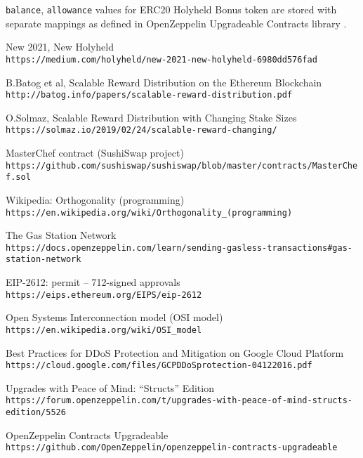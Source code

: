 \documentclass[12pt]{article}
\begin{document}
\texttt{balance}, \texttt{allowance} values for ERC20 Holyheld Bonus token are stored with separate mappings as defined in OpenZeppelin Upgradeable Contracts library \cite{openzeppelin_upgradeable}.





\begin{thebibliography}{3}

New 2021, New Holyheld
\\\texttt{https://medium.com/holyheld/new-2021-new-holyheld-6980dd576fad}

B.Batog et al, Scalable Reward Distribution on the Ethereum Blockchain
\\\texttt{http://batog.info/papers/scalable-reward-distribution.pdf}

O.Solmaz, Scalable Reward Distribution with Changing Stake Sizes
\\\texttt{https://solmaz.io/2019/02/24/scalable-reward-changing/}

MasterChef contract (SushiSwap project)
\\\texttt{https://github.com/sushiswap/sushiswap/blob/master/contracts/MasterChef.sol}

Wikipedia: Orthogonality (programming)
\\\texttt{https://en.wikipedia.org/wiki/Orthogonality\_(programming)}

The Gas Station Network
\\\texttt{https://docs.openzeppelin.com/learn/sending-gasless-transactions\#gas-station-network}

EIP-2612: permit – 712-signed approvals
\\\texttt{https://eips.ethereum.org/EIPS/eip-2612}

Open Systems Interconnection model (OSI model)
\\\texttt{https://en.wikipedia.org/wiki/OSI\_model}

Best Practices for DDoS Protection and Mitigation on Google Cloud Platform
\\\texttt{https://cloud.google.com/files/GCPDDoSprotection-04122016.pdf}

Upgrades with Peace of Mind: “Structs” Edition
\\\texttt{https://forum.openzeppelin.com/t/upgrades-with-peace-of-mind-structs-edition/5526}

OpenZeppelin Contracts Upgradeable
\\\texttt{https://github.com/OpenZeppelin/openzeppelin-contracts-upgradeable}

\end{thebibliography}
\end{document}
